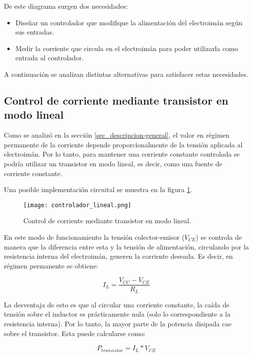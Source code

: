De este diagrama surgen dos necesidades:
\begin{itemize}
	\item Diseñar un controlador que modifique la alimentación del electroimán según sus entradas.
	\item Medir la corriente que circula en el electroimán para poder utilizarla como entrada al controlador.
\end{itemize}

A continuación se analizan distintas alternativas para satisfacer estas necesidades.

\subsection{Control de corriente mediante transistor en modo lineal}

Como se analizó en la sección \ref{sec_descripcion-general}, el valor en régimen permanente de la corriente depende proporcionalmente de la tensión aplicada al electroimán. Por lo tanto, para mantener una corriente constante controlada se podría utilizar un transistor en modo lineal, es decir, como una fuente de corriente constante. 

Una posible implementación circuital se muestra en la figura \ref{fig:img_controlador-lineal}.

\begin{figure}[H]
	\centering
	\texttt{[image: controlador\_lineal.png]}
	\caption{Control de corriente mediante transistor en modo lineal.}
	\label{fig:img_controlador-lineal}
\end{figure}

En este modo de funcionamiento la tensión colector-emisor ($V_{CE}$) se controla de manera que la diferencia entre esta y la tensión de alimentación, circulando por la resistencia interna del electroimán, generen la corriente deseada. Es decir, en régimen permanente se obtiene:
 
 \begin{equation}
 	I_L=\frac{V_{CC}-V_{CE}}{R_L}
 \end{equation}
 
La desventaja de esto es que al circular una corriente constante, la caída de tensión sobre el inductor es prácticamente nula (solo lo correspondiente a la resistencia interna). Por lo tanto, la mayor parte de la potencia disipada cae sobre el transistor. Esta puede calcularse como: 

\begin{equation}
	P_{transistor} = I_L*V_{CE}
\end{equation}

